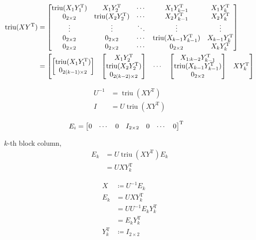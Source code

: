 \documentclass[11pt]{article}
\newcommand{\triu}{\mathop{\mathrm{triu}}}
\newcommand{\T}{\mathrm{T}}
\begin{document}
\begin{align*}
    \triu(XY^{\T}) &= \mqty[
        \triu(X_{1} Y_{1}^{\T}) & X_{1} Y_{2}^{\T} & \cdots & X_{1} Y_{k-1}^{\T} & X_{1} Y_{k}^{\T}\\
        0_{2 \times 2} & \triu(X_{2} Y_{2}^{\T}) & \cdots & X_{2} Y_{k-1}^{\T} & X_{2} Y_{k}^{\T}\\
        \vdots & \vdots & \ddots & \vdots & \vdots\\
        0_{2 \times 2} & 0_{2 \times 2} & \cdots & \triu(X_{k-1} Y_{k-1}^{\T}) & X_{k-1} Y_{k}^{\T}\\
        0_{2 \times 2} & 0_{2 \times 2} & \cdots & 0_{2 \times 2} & X_{k} Y_{k}^{\T}
        ]\\
    &= \mqty[
        \mqty[
            \triu(X_{1} Y_{1}^{\T}) \\
            0_{2(k-1) \times 2}
            ] &
        \mqty[
            X_{1} Y_{2}^{\T} \\
            \triu(X_{2} Y_{2}^{\T}) \\
            0_{2(k-2) \times 2}
            ] &
        \cdots &
        \mqty[
            X_{1:k-2}Y_{k-1}^{\T} \\
            \triu(X_{k-1}Y_{k-1}^{\T}) \\
            0_{2 \times 2}
            ] &
        X Y_{k}^{\T}
        ]
\end{align*}


\begin{align*}
    U^{-1} &= \triu(XY^{\T}) \\
    I &= U \triu(XY^{\T})
\end{align*}

\begin{align*}
    E_{i} &= \mqty[0 & \cdots & 0 & I_{2 \times 2} & 0 & \cdots & 0]^{\T}
\end{align*}




$k$-th block column, 
\begin{align*}
    E_{k} &= U \triu(XY^{\T})E_{k} \\
    &= U X Y_{k}^{\T}
\end{align*}


\begin{align*}
    X &\coloneqq U^{-1} E_{k} \\
    E_{k} &= U X Y_{k}^{\T} \\
        &= U U^{-1} E_{k} Y_{k}^{\T} \\
        &= E_{k} Y_{k}^{\T} \\
    Y_{k}^{\T} &\coloneqq I_{2 \times 2}
\end{align*}
\end{document}
